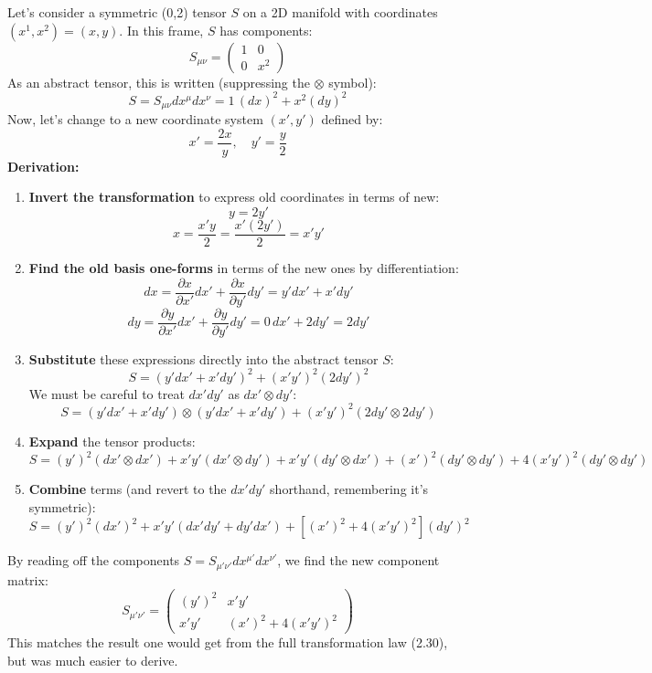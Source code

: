 \documentclass[11pt, a4paper]{report}
\begin{document}
Let's consider a symmetric (0,2) tensor $S$ on a 2D manifold with coordinates $(x^1, x^2) = (x, y)$. In this frame, $S$ has components:
\[
    S_{\mu\nu} = \begin{pmatrix} 1 & 0 \\ 0 & x^2 \end{pmatrix}
\]
As an abstract tensor, this is written (suppressing the $\otimes$ symbol):
\begin{equation}
    S = S_{\mu\nu} dx^\mu dx^\nu = 1 \, (dx)^2 + x^2 (dy)^2
\end{equation}
Now, let's change to a new coordinate system $(x', y')$ defined by:
\[
    x' = \frac{2x}{y}, \quad y' = \frac{y}{2}
\]
\textbf{Derivation:}
\begin{enumerate}
    \item \textbf{Invert the transformation} to express old coordinates in terms of new:
    \[
        y = 2y'
    \]
    \[
        x = \frac{x' y}{2} = \frac{x' (2y')}{2} = x'y'
    \]
    \item \textbf{Find the old basis one-forms} in terms of the new ones by differentiation:
    \[
        dx = \frac{\partial x}{\partial x'} dx' + \frac{\partial x}{\partial y'} dy' = y' dx' + x' dy'
    \]
    \[
        dy = \frac{\partial y}{\partial x'} dx' + \frac{\partial y}{\partial y'} dy' = 0 \, dx' + 2 dy' = 2 dy'
    \]
    \item \textbf{Substitute} these expressions directly into the abstract tensor $S$:
    \[
        S = (y'dx' + x'dy')^2 + (x'y')^2 (2dy')^2
    \]
    We must be careful to treat $dx'dy'$ as $dx' \otimes dy'$:
    \[
        S = (y'dx' + x'dy') \otimes (y'dx' + x'dy') + (x'y')^2 (2dy' \otimes 2dy')
    \]
    \item \textbf{Expand} the tensor products:
    \[
        S = (y')^2 (dx' \otimes dx') + x'y' (dx' \otimes dy') + x'y' (dy' \otimes dx') + (x')^2 (dy' \otimes dy') + 4(x'y')^2 (dy' \otimes dy')
    \]
    \item \textbf{Combine} terms (and revert to the $dx'dy'$ shorthand, remembering it's symmetric):
    \[
        S = (y')^2 (dx')^2 + x'y' (dx'dy' + dy'dx') + \left[ (x')^2 + 4(x'y')^2 \right] (dy')^2
    \]
\end{enumerate}
By reading off the components $S = S_{\mu'\nu'} dx^{\mu'} dx^{\nu'}$, we find the new component matrix:
\begin{equation} \label{S_transform}
    S_{\mu'\nu'} = \begin{pmatrix}
        (y')^2 & x'y' \\
        x'y' & (x')^2 + 4(x'y')^2
    \end{pmatrix}
\end{equation}
This matches the result one would get from the full transformation law (2.30), but was much easier to derive.
\end{document}
